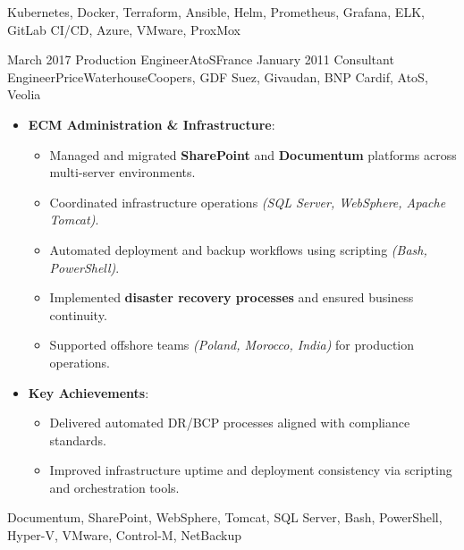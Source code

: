 \begin{experiences}
{\begin{itemize}[left=0pt,label={},itemsep=0.5em]
        \end{itemize}
    }
        \vspace{0.5em}   %
    {Kubernetes, Docker, Terraform, Ansible, Helm, Prometheus, Grafana, ELK, GitLab CI/CD, Azure, VMware, ProxMox}

\emptySeparator
\emptySeparator

\consultantexperience
    {March 2017}       {Production Engineer}{AtoS}{France}
    {January 2011}    {Consultant Engineer}{PriceWaterhouseCoopers, GDF Suez, Givaudan, BNP Cardif, AtoS, Veolia} {
        \begin{itemize}[left=0pt,label={},itemsep=0.4em]


          \item \textbf{ECM Administration \& Infrastructure}:
            \begin{itemize}[itemsep=0.15em,topsep=0.1em,parsep=0pt]
              \small
              \item Managed and migrated \textbf{SharePoint} and \textbf{Documentum} platforms across multi-server environments.
              \item Coordinated infrastructure operations \emph{(SQL Server, WebSphere, Apache Tomcat)}.
              \item Automated deployment and backup workflows using scripting \emph{(Bash, PowerShell)}.
              \item Implemented \textbf{disaster recovery processes} and ensured business continuity.
              \item Supported offshore teams \emph{(Poland, Morocco, India)} for production operations.
            \end{itemize}

          \item \textbf{Key Achievements}:
            \begin{itemize}[itemsep=0.2em,topsep=0.2em,parsep=0pt]
              \small
              \item Delivered automated DR/BCP processes aligned with compliance standards.
              \item Improved infrastructure uptime and deployment consistency via scripting and orchestration tools.
            \end{itemize}
        \end{itemize}
    }
        \vspace{0.5em}   %
    {Documentum, SharePoint, WebSphere, Tomcat, SQL Server, Bash, PowerShell, Hyper-V, VMware, Control-M, NetBackup}


\end{experiences}
